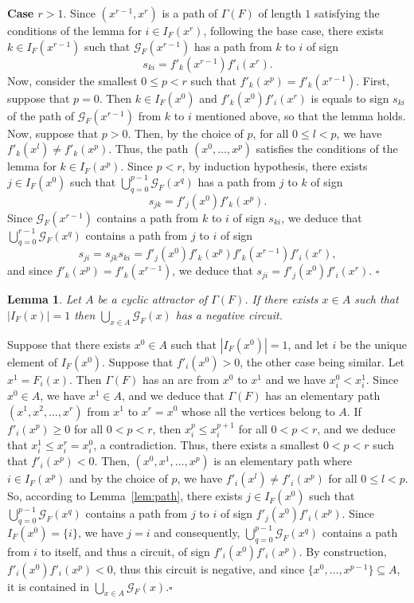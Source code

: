 \documentclass[11pt]{article}
\newtheorem{lemma}{Lemma}
\def\proof{\noindent{\bf Proof --~}}
\def\cqfd{\hfill$\square$}
\def\G{\mathscr{G}}
\begin{document}
\noindent
{\bf Case \boldmath$r>1$\unboldmath}. Since $(x^{r-1},x^r)$ is a path
of $\Gamma(F)$ of length $1$ satisfying the conditions of the lemma
for $i\in I_F(x^r)$, following the base case, there exists $k\in
I_F(x^{r-1})$ such that $\G_F(x^{r-1})$ has a path from $k$ to $i$ of
sign
\[
s_{ki}=f'_k(x^{r-1})f'_i(x^r).
\] 
Now, consider the smallest $0\leq p<r$ such that
$f'_k(x^p)=f'_k(x^{r-1})$. First, suppose that $p=0$. Then $k\in
I_F(x^0)$ and $f'_k(x^0)f'_i(x^r)$ is equals to sign $s_{ki}$ of the
path of $\G_F(x^{r-1})$ from $k$ to $i$ mentioned above, so that the
lemma holds. Now, suppose that $p>0$. Then, by the choice of $p$, for
all $0\leq l< p$, we have $f'_k(x^l)\neq f'_k(x^p)$. Thus, the path
$(x^0,\dots,x^p)$ satisfies the conditions of the lemma for $k\in
I_F(x^p)$. Since $p<r$, by induction hypothesis, there exists $j\in
I_F(x^0)$ such that $\bigcup_{q=0}^{p-1} \G_F(x^q)$ has a path from
$j$ to $k$ of sign
\[
s_{jk}=f'_j(x^0)f'_k(x^p).
\]
Since $\G_F(x^{r-1})$ contains a path from $k$ to $i$ of sign
$s_{ki}$, we deduce that $\bigcup_{q=0}^{r-1} \G_F(x^q)$ contains a
path from $j$ to $i$ of sign
\[
s_{ji}=s_{jk}s_{ki}=f'_j(x^0)f'_k(x^p)f'_k(x^{r-1})f'_i(x^r), 
\]
and since $f'_k(x^p)=f'_k(x^{r-1})$, we deduce that
$s_{ji}=f'_j(x^0)f'_i(x^r)$.
\cqfd


\begin{lemma}\label{lem:base}
Let $A$ be a cyclic attractor of $\Gamma(F)$. If there exists $x\in A$
such that $|I_F(x)|=1$ then $\bigcup_{x\in A} \G_F(x)$ has a negative
circuit.
\end{lemma}

\proof
Suppose that there exists $x^0\in A$ such that $|I_F(x^0)|=1$, and let
$i$ be the unique element of $I_F(x^0)$. Suppose that $f'_i(x^0)>0$,
the other case being similar. Let $x^1=F_i(x)$. Then $\Gamma(F)$ has
an arc from $x^0$ to $x^1$ and we have $x^0_i<x^1_i$. Since $x^0\in
A$, we have $x^1\in A$, and we deduce that $\Gamma(F)$ has an
elementary path $(x^1,x^2,\dots,x^r)$ from $x^1$ to $x^r=x^0$ whose
all the vertices belong to $A$. If $f'_i(x^p)\geq 0$ for all $0<p<r$,
then $x^p_i\leq x^{p+1}_i$ for all $0<p<r$, and we deduce that
$x^1_i\leq x^r_i=x^0_i$, a contradiction. Thus, there exists a
smallest $0<p< r$ such that $f'_i(x^p)<0$. Then, $(x^0,x^1,\dots,x^p)$
is an elementary path where $i\in I_F(x^p)$ and by the choice of $p$,
we have $f'_i(x^l)\neq f'_i(x^p)$ for all $0\leq l<p$. So, according
to Lemma~{\ref{lem:path}}, there exists $j\in I_F(x^0)$ such that
$\bigcup_{q=0}^{p-1}\G_F(x^q)$ contains a path from $j$ to $i$ of sign
$f'_j(x^0)f'_i(x^p)$. Since $I_F(x^0)=\{i\}$, we have $j=i$ and
consequently, $\bigcup_{q=0}^{p-1}\G_F(x^q)$ contains a path from $i$
to itself, and thus a circuit, of sign $f'_i(x^0)f'_i(x^p)$. By
construction, $f'_i(x^0)f'_i(x^p)<0$, thus this circuit is negative,
and since $\{x^0,\dots,x^{p-1}\}\subseteq A$, it is contained in
$\bigcup_{x\in A}\G_F(x)$.\cqfd
\end{document}
